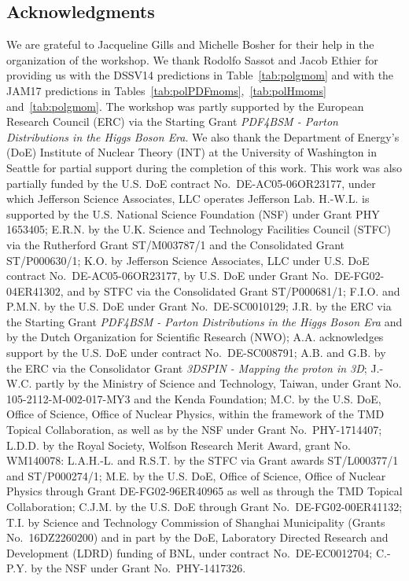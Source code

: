 \subsection*{Acknowledgments}

We are grateful to Jacqueline Gills and Michelle Bosher for their help in the
organization of the workshop.
%
We thank Rodolfo Sassot and Jacob Ethier for providing us with the 
DSSV14 predictions in Table~\ref{tab:polgmom} and with the JAM17 predictions in
Tables~\ref{tab:polPDFmoms},~\ref{tab:polHmoms} and~\ref{tab:polgmom}.
%
The workshop was partly supported by the European Research Council (ERC) via 
the Starting Grant {\it PDF4BSM - Parton Distributions in the Higgs Boson Era}.
%
We also thank the Department of Energy's (DoE) Institute of Nuclear Theory 
(INT) at the University of Washington in Seattle for partial support during 
the completion of this work.
%
This work was also partially funded by the U.S. DoE contract 
No.~DE-AC05-06OR23177, under which Jefferson Science Associates, 
LLC operates Jefferson Lab. 
% 
H.-W.L. is supported by the U.S. National Science Foundation (NSF) under Grant 
PHY 1653405; E.R.N. by the U.K. Science and Technology Facilities Council 
(STFC) via the Rutherford Grant ST/M003787/1 and the Consolidated Grant 
ST/P000630/1; K.O. by Jefferson Science Associates, LLC under U.S. 
DoE contract No.~DE-AC05-06OR23177, 
by U.S. DoE under Grant No.~DE-FG02-04ER41302, 
and by STFC via the Consolidated Grant ST/P000681/1; 
F.I.O. and P.M.N. by the U.S. 
DoE under Grant No.~DE-SC0010129; J.R. by the ERC via the Starting 
Grant {\it PDF4BSM - Parton Distributions in the Higgs Boson Era} and by the 
Dutch Organization for Scientific Research (NWO);
%
A.A. acknowledges support by the U.S. DoE under contract No.~DE-SC008791;
A.B. and G.B. by the ERC via the Consolidator Grant {\it 3DSPIN - Mapping the
proton in 3D};
J.-W.C. partly by the Ministry of Science and Technology, Taiwan,
under Grant No. 105-2112-M-002-017-MY3 and the Kenda Foundation;
M.C. by the U.S. DoE, Office of Science, Office of Nuclear Physics, within the 
framework of the TMD Topical Collaboration, as well as by the NSF under Grant 
No.~PHY-1714407;
L.D.D. by the Royal Society, Wolfson Research Merit Award,
grant No. WM140078:
L.A.H.-L. and R.S.T. by the STFC via Grant awards ST/L000377/1 and ST/P000274/1;
M.E. by the U.S. DoE, Office of Science, Office of Nuclear Physics through 
Grant DE-FG02-96ER40965 as well as through the TMD Topical Collaboration;
C.J.M. by the U.S. DoE through Grant No.~DE-FG02-00ER41132;
T.I. by Science and Technology Commission of Shanghai Municipality 
(Grants No.~16DZ2260200) and in part by the DoE, Laboratory Directed Research 
and Development (LDRD) funding of BNL, under contract No.~DE-EC0012704;
C.-P.Y. by the NSF under Grant No.~PHY-1417326.



